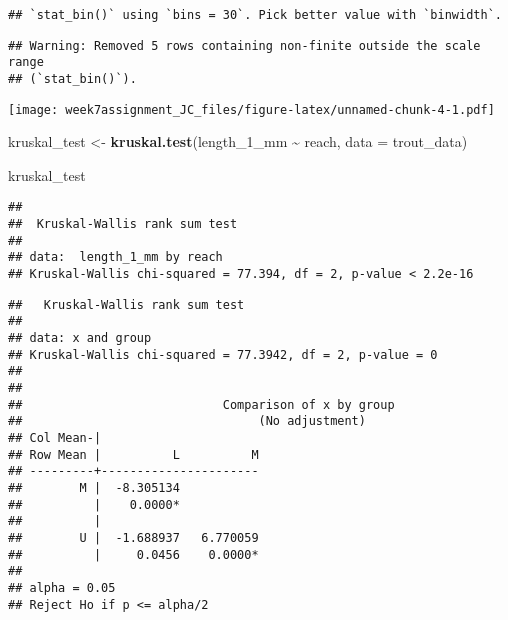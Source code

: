 \documentclass[
]{article}
\newenvironment{Shaded}{\begin{snugshade}}{\end{snugshade}}
\newcommand{\AttributeTok}[1]{\textcolor[rgb]{0.13,0.29,0.53}{#1}}
\newcommand{\CommentTok}[1]{\textcolor[rgb]{0.56,0.35,0.01}{\textit{#1}}}
\newcommand{\FunctionTok}[1]{\textcolor[rgb]{0.13,0.29,0.53}{\textbf{#1}}}
\newcommand{\NormalTok}[1]{#1}
\newcommand{\OtherTok}[1]{\textcolor[rgb]{0.56,0.35,0.01}{#1}}
\newcommand{\SpecialCharTok}[1]{\textcolor[rgb]{0.81,0.36,0.00}{\textbf{#1}}}
\begin{document}
\begin{verbatim}
## `stat_bin()` using `bins = 30`. Pick better value with `binwidth`.
\end{verbatim}

\begin{verbatim}
## Warning: Removed 5 rows containing non-finite outside the scale range
## (`stat_bin()`).
\end{verbatim}

\texttt{[image: week7assignment\_JC\_files/figure-latex/unnamed-chunk-4-1.pdf]}

\begin{Shaded}
\begin{Highlighting}[]
\NormalTok{kruskal\_test }\OtherTok{\textless{}{-}} \FunctionTok{kruskal.test}\NormalTok{(length\_1\_mm }\SpecialCharTok{\textasciitilde{}}\NormalTok{ reach, }\AttributeTok{data =}\NormalTok{ trout\_data)}

\NormalTok{kruskal\_test}
\end{Highlighting}
\end{Shaded}

\begin{verbatim}
## 
##  Kruskal-Wallis rank sum test
## 
## data:  length_1_mm by reach
## Kruskal-Wallis chi-squared = 77.394, df = 2, p-value < 2.2e-16
\end{verbatim}

\begin{Shaded}
\end{Shaded}

\begin{verbatim}
##   Kruskal-Wallis rank sum test
## 
## data: x and group
## Kruskal-Wallis chi-squared = 77.3942, df = 2, p-value = 0
## 
## 
##                            Comparison of x by group                            
##                                 (No adjustment)                                
## Col Mean-|
## Row Mean |          L          M
## ---------+----------------------
##        M |  -8.305134
##          |    0.0000*
##          |
##        U |  -1.688937   6.770059
##          |     0.0456    0.0000*
## 
## alpha = 0.05
## Reject Ho if p <= alpha/2
\end{verbatim}
\end{document}
